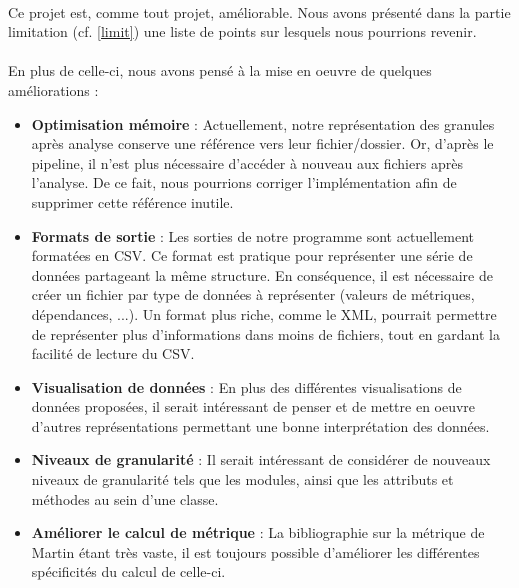 \documentclass{scrartcl}
\begin{document}
    \paragraph{}Ce projet est, comme tout projet, améliorable. Nous avons présenté dans la partie limitation (cf. \ref{limit}) une liste de points sur lesquels nous pourrions revenir.
    
    \paragraph{}En plus de celle-ci, nous avons pensé à la mise en oeuvre de quelques améliorations :
    \begin{itemize}
    
        \item \textbf{Optimisation mémoire} : Actuellement, notre représentation des granules après analyse conserve une référence vers leur fichier/dossier. Or, d'après le pipeline, il n'est plus nécessaire d'accéder à nouveau aux fichiers après l'analyse. De ce fait, nous pourrions corriger l'implémentation afin de supprimer cette référence inutile.
        
        \item \textbf{Formats de sortie} : Les sorties de notre programme sont actuellement formatées en CSV. Ce format est pratique pour représenter une série de données partageant la même structure. En conséquence, il est nécessaire de créer un fichier par type de données à représenter (valeurs de métriques, dépendances, ...). Un format plus riche, comme le XML, pourrait permettre de représenter plus d'informations dans moins de fichiers, tout en gardant la facilité de lecture du CSV.

        \item \textbf{Visualisation de données} : En plus des différentes visualisations de données proposées, il serait intéressant de penser et de mettre en oeuvre d'autres représentations permettant une bonne interprétation des données.
        
        \item \textbf{Niveaux de granularité} : Il serait intéressant de considérer de nouveaux niveaux de granularité tels que les modules, ainsi que les attributs et méthodes au sein d'une classe.

        \item \textbf{Améliorer le calcul de métrique} : La bibliographie sur la métrique de Martin étant très vaste, il est toujours possible d'améliorer les différentes spécificités du calcul de celle-ci. 
        

\end{itemize}
\end{document}
